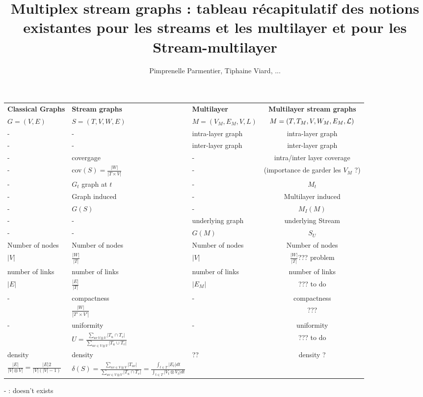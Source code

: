 \documentclass[dvipsnames,a4paper,11pt]{article}
\title{Multiplex stream graphs : tableau récapitulatif des notions existantes pour les streams et les multilayer et pour les Stream-multilayer}
\author{Pimprenelle Parmentier, Tiphaine Viard, ...}
\begin{document}
    \maketitle
	\begin{tabularx}{\linewidth}{|X||X|X||c|}
		\hline
		\textbf{Classical Graphs} & \textbf{Stream graphs} & \textbf{Multilayer} & \textbf{Multilayer stream graphs}\\
		$G=(V,E)$ & $S = (T,V,W,E)$ &  $M= (V_M,E_M,V,L)$ & $M = (T,T_M,V,W_M,E_M,{\cal L})$\\
		\hline
		\hline
		- & - & intra-layer graph & intra-layer graph\\
		\hline
		- & - & inter-layer graph & inter-layer graph \\
		\hline
		\hline
		- & covergage & - & intra/inter layer coverage \\
		- & cov$(S)=\frac{|W|}{|T\times V|}$&-& (importance de garder les $V_M$ ?)\\
		\hline
		- & $G_t$ graph at $t$ & - & $M_t$ \\
		\hline
		- & Graph induced & - & Multilayer induced \\
		\hline
		- & $G(S)$ & - & $M_I(M)$\\
		\hline
		- & - & underlying graph & underlying Stream \\
		- & - & $G(M)$ & $S_U$\\
		\hline
		Number of nodes & Number of nodes & Number of nodes & Number of nodes \\
		$|V|$ & $\frac{|W|}{|T|}$ & $|V|$ & $\frac{|W|}{|T|}$??? problem\\
		\hline
		number of links & number of links & number of links & number of links\\
		$|E|$ & $\frac{|E|}{|T|}$ & $|E_M|$ & ??? to do\\
		\hline
		- & compactness & - & compactness \\
		 & $\frac{|W|}{|T'\times V'|}$& &???\\
		 \hline
		 - & uniformity & - & uniformity \\
		 & $U = \frac{\sum_{uv \ V \otimes V}{|T_u \cap T_v|}}{\sum_{uv \in V\otimes V}{|T_u\cup T_v|}}$& & ??? to do\\
		 \hline
		 density & density & ?? & density ? \\
		 $\frac{|E|}{|V|\otimes V|} = \frac{|E|2}{|V|(|V|-1)} $& $\delta(S) = \frac{\sum_{uv \in V \otimes V}{|T_{uv}|}}{\sum_{uv \in V\otimes V}{|T_u\cap T_v|}}= \frac{\int_{t\in T}{|E_t|dt}}{\int_{t\in T}{|V_t\otimes V_t|dt}}$ & & \\
		 \hline
		 \hline
		 
	\end{tabularx}
	- : doesn't exists
\end{document}
